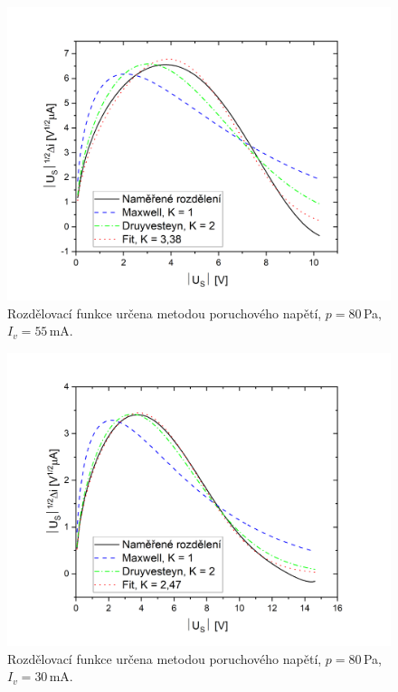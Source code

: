 \documentclass[a4paper,12pt]{article}
\begin{document}
\begin{figure}[h!]
	\centering
	\includegraphics[width=135mm]{rozdeleniG1.png}
	\caption{Rozdělovací funkce určena metodou poruchového napětí, 
	$p=80$\,\si{\pascal}, $I_v = 55$\,\si{\milli\ampere}.}
	\label{rozdeleniG1}
\end{figure}

\begin{figure}[h!]
	\centering
	\includegraphics[width=135mm]{rozdeleniG2.png}
	\caption{Rozdělovací funkce určena metodou poruchového napětí, 
	$p=80$\,\si{\pascal}, $I_v = 30$\,\si{\milli\ampere}.}
	\label{rozdeleniG2}
\end{figure}
\end{document}
